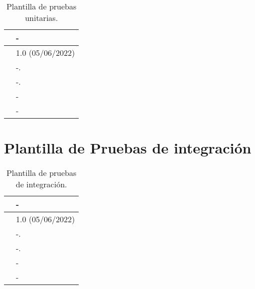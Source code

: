 \begin{table}[H]
\begin{center}
\begin{tabular}{|p{3cm}|p{10cm}|} \hline
\centering {\bf PU-XX} & -  \\ \hline\hline
\centering {\bf Versión} & 1.0 (05/06/2022) \\ \hline
\centering {\bf Dependencias} &  -. \\ \hline
\centering {\bf Descripción} &  -. \\ \hline
\centering {\bf Criterio de aceptación} & - \\ \hline
\centering {\bf Estado} & - \\ \hline
\end{tabular}
\caption{Plantilla de pruebas unitarias.}
\label{enlacePUX}
\end{center}
\end{table}


\section{Plantilla de Pruebas de integración}

\begin{table}[H]
\begin{center}
\begin{tabular}{|p{3cm}|p{10cm}|} \hline
\centering {\bf PI-XX} & -  \\ \hline\hline
\centering {\bf Versión} & 1.0 (05/06/2022) \\ \hline
\centering {\bf Dependencias} &  -. \\ \hline
\centering {\bf Descripción} &  -. \\ \hline
\centering {\bf Criterio de aceptación} & - \\ \hline
\centering {\bf Estado} & - \\ \hline
\end{tabular}
\caption{Plantilla de pruebas de integración.}
\label{enlacePIX}
\end{center}
\end{table}